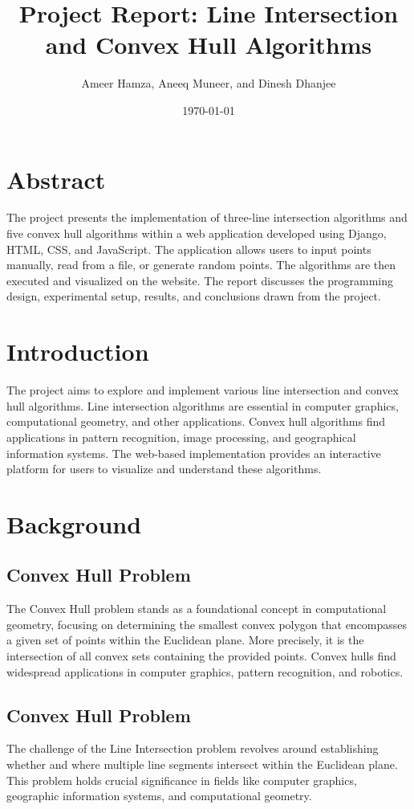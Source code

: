 \documentclass[10pt,twocolumn]{article}
\title{Project Report: Line Intersection and Convex Hull Algorithms}
\author{Ameer Hamza, Aneeq Muneer, and Dinesh Dhanjee}
\date{\today}
\begin{document}
\maketitle
\section{Abstract}
    The project presents the implementation of three-line intersection algorithms and five convex hull algorithms within a web application developed using Django, HTML, CSS, and JavaScript. The application allows users to input points manually, read from a file, or generate random points. The algorithms are then executed and visualized on the website. The report discusses the programming design, experimental setup, results, and conclusions drawn from the project.

\section{Introduction}
    The project aims to explore and implement various line intersection and convex hull algorithms. Line intersection algorithms are essential in computer graphics, computational geometry, and other applications. Convex hull algorithms find applications in pattern recognition, image processing, and geographical information systems. The web-based implementation provides an interactive platform for users to visualize and understand these algorithms.


\section{Background}
    \subsection{Convex Hull Problem}
        The Convex Hull problem stands as a foundational concept in computational geometry, focusing on determining the smallest convex polygon that encompasses a given set of points within the Euclidean plane. More precisely, it is the intersection of all convex sets containing the provided points. Convex hulls find widespread applications in computer graphics, pattern recognition, and robotics.

    \subsection{Convex Hull Problem}
        The challenge of the Line Intersection problem revolves around establishing whether and where multiple line segments intersect within the Euclidean plane. This problem holds crucial significance in fields like computer graphics, geographic information systems, and computational geometry.
\end{document}
